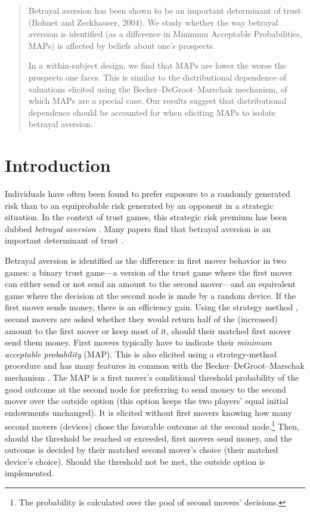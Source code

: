\begin{titlepage}
\begin{abstract}
Betrayal aversion has been shown to be an important determinant of trust (Bohnet and Zeckhauser, 2004).
We study whether the way betrayal aversion is identified (as a difference in Minimum Acceptable Probabilities, MAPs) is affected by beliefs about one’s prospects.

In a within-subject design, we find that MAPs are lower the worse the prospects one faces.
This is similar to the distributional dependence of valuations elicited using the Becker–DeGroot–Marschak mechanism, of which MAPs are a special case.
Our results suggest that distributional dependence should be accounted for when eliciting MAPs to isolate betrayal aversion.

\end{abstract}
\end{titlepage}


\section{Introduction}\label{sec:intro}
Individuals have often been found to prefer exposure to a randomly generated risk than to an equiprobable risk generated by an opponent in a strategic situation.
In the context of trust games, this strategic risk premium has been dubbed \textit{betrayal aversion} \citep{Bohnet2004}.
Many papers find that betrayal aversion is an important determinant of trust \citep{Bohnet2004, Aimone2015, Fairley2016, Quercia2016, Bacine2018, Butler2018, Polipciuc2022motive}.

Betrayal aversion is identified as the difference in first mover behavior in two games: a binary trust game---a version of the trust game \citep{Berg1995} where the first mover can either send or not send an amount to the second mover---and an equivalent game where the decision at the second node is made by a random device.
If the first mover sends money, there is an efficiency gain.
Using the strategy method \citep{Selten1967}, second movers are asked whether they would return half of the (increased) amount to the first mover or keep most of it, should their matched first mover send them money.
First movers typically have to indicate their \textit{minimum acceptable probability} (MAP).
This is also elicited using a strategy-method procedure and has many features in common with the Becker--DeGroot--Marschak mechanism \citep[in short, BDM]{Becker1964}.
The MAP is a first mover's conditional threshold probability of the good outcome at the second node for preferring to send money to the second mover over the outside option (this option keeps the two players' equal initial endowments unchanged).
It is elicited without first movers knowing how many second movers (devices) chose the favorable outcome at the second node.\footnote{
The probability is calculated over the pool of second movers' decisions.
}
Then, should the threshold be reached or exceeded, first movers send money, and the outcome is decided by their matched second mover's choice (their matched device's choice).
Should the threshold not be met, the outside option is implemented.

